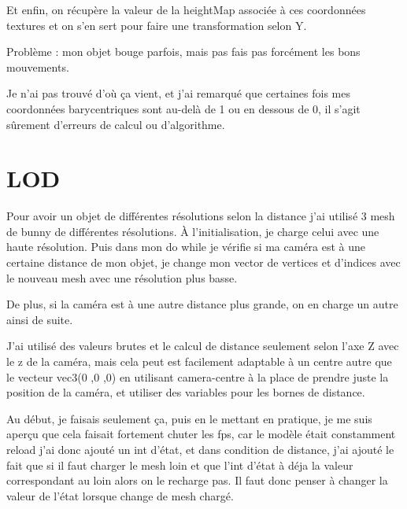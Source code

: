 \documentclass{article}
\begin{document}
Et enfin, on récupère la valeur de la heightMap associée à ces coordonnées textures et on s'en sert pour faire une transformation selon Y.





Problème : mon objet bouge parfois, mais pas fais pas forcément les bons mouvements.



Je n'ai pas trouvé d'où ça vient, et j'ai remarqué que certaines fois mes coordonnées barycentriques sont au-delà de 1 ou en dessous de 0, il s'agit sûrement d'erreurs de calcul ou d'algorithme.


\section{LOD}
Pour avoir un objet de différentes résolutions selon la distance j'ai utilisé 3 mesh de bunny de différentes résolutions. À l'initialisation, je charge celui avec une haute résolution. Puis dans mon do while je vérifie si ma caméra est à une certaine distance de mon objet, je change mon vector de vertices et d'indices avec le nouveau mesh avec une résolution plus basse.



De plus, si la caméra est à une autre distance plus grande, on en charge un autre ainsi de suite.



J'ai utilisé des valeurs brutes et le calcul de distance seulement selon l'axe Z avec le z de la caméra, mais cela peut est facilement adaptable à un centre autre que le vecteur vec3(0 ,0 ,0) en utilisant camera-centre à la place de prendre juste la position de la caméra, et utiliser des variables pour les bornes de distance.





Au début, je faisais seulement ça, puis en le mettant en pratique, je me suis aperçu que cela faisait fortement chuter les fps, car le modèle était constamment reload j'ai donc ajouté un int d'état, et dans condition de distance, j'ai ajouté le fait que si il faut charger le mesh loin et que l'int d'état à déja la valeur correspondant au loin alors on le recharge pas. Il faut donc penser à changer la valeur de l'état lorsque change de mesh chargé.
\end{document}
